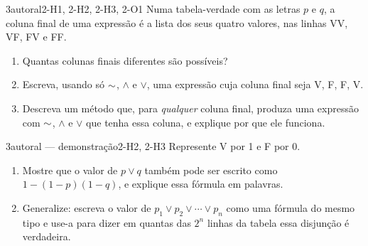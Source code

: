 \begin{questao}{3}{autoral}{2-H1, 2-H2, 2-H3, 2-O1}\label{u2:q11}
Numa tabela-verdade com as letras $p$ e $q$, a coluna final de uma expressão é a lista dos seus quatro valores, nas linhas VV, VF, FV e FF.
\begin{enumerate}[label=\alph*)]
  \item Quantas colunas finais diferentes são possíveis?
  \item Escreva, usando só ${{\sim}}$, $\wedge$ e $\vee$, uma expressão cuja coluna final seja V, F, F, V.
  \item Descreva um método que, para \emph{qualquer} coluna final, produza uma expressão com ${{\sim}}$, $\wedge$ e $\vee$ que tenha essa coluna, e explique por que ele funciona.
\end{enumerate}
\end{questao}

\begin{questao}{3}{autoral — demonstração}{2-H2, 2-H3}\label{u2:q12}
Represente V por 1 e F por 0.
\begin{enumerate}[label=\alph*)]
  \item Mostre que o valor de $p\vee q$ também pode ser escrito como $1-(1-p)(1-q)$, e explique essa fórmula em palavras.
  \item Generalize: escreva o valor de $p_1\vee p_2\vee\cdots\vee p_n$ como uma fórmula do mesmo tipo e use-a para dizer em quantas das $2^n$ linhas da tabela essa disjunção é verdadeira.
\end{enumerate}
\end{questao}

